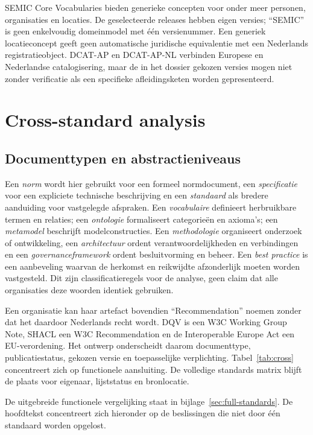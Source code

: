 SEMIC Core Vocabularies bieden generieke concepten voor onder meer personen, organisaties en locaties. De geselecteerde releases hebben eigen versies; ``SEMIC'' is geen enkelvoudig domeinmodel met één versienummer. \citep{S44} Een generiek locatieconcept geeft geen automatische juridische equivalentie met een Nederlands registratieobject. DCAT-AP en DCAT-AP-NL verbinden Europese en Nederlandse catalogisering, maar de in het dossier gekozen versies mogen niet zonder verificatie als een specifieke afleidingsketen worden gepresenteerd. \citep{S45,S16}

\section{Cross-standard analysis}
\label{sec:cross}
\subsection{Documenttypen en abstractieniveaus}
Een \emph{norm} wordt hier gebruikt voor een formeel normdocument, een \emph{specificatie} voor een expliciete technische beschrijving en een \emph{standaard} als bredere aanduiding voor vastgelegde afspraken. Een \emph{vocabulaire} definieert herbruikbare termen en relaties; een \emph{ontologie} formaliseert categorieën en axioma’s; een \emph{metamodel} beschrijft modelconstructies. Een \emph{methodologie} organiseert onderzoek of ontwikkeling, een \emph{architectuur} ordent verantwoordelijkheden en verbindingen en een \emph{governanceframework} ordent besluitvorming en beheer. Een \emph{best practice} is een aanbeveling waarvan de herkomst en reikwijdte afzonderlijk moeten worden vastgesteld. Dit zijn classificatieregels voor de analyse, geen claim dat alle organisaties deze woorden identiek gebruiken.

Een organisatie kan haar artefact bovendien ``Recommendation'' noemen zonder dat het daardoor Nederlands recht wordt. DQV is een W3C Working Group Note, SHACL een W3C Recommendation en de Interoperable Europe Act een EU-verordening. \citep{S34,S32,S42} Het ontwerp onderscheidt daarom documenttype, publicatiestatus, gekozen versie en toepasselijke verplichting. Tabel~\ref{tab:cross} concentreert zich op functionele aansluiting. De volledige standards matrix blijft de plaats voor eigenaar, lijststatus en bronlocatie.

De uitgebreide functionele vergelijking staat in bijlage~\ref{sec:full-standards}. De hoofdtekst concentreert zich hieronder op de beslissingen die niet door één standaard worden opgelost.


